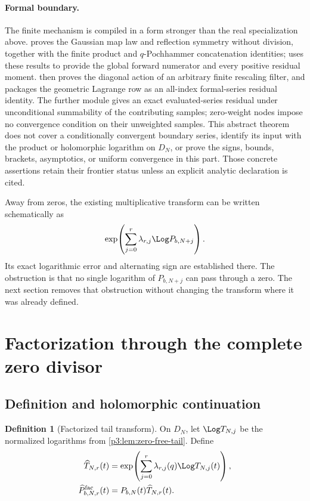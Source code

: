 \documentclass[11pt]{article}
\numberwithin{equation}{section}
\theoremstyle{definition}
\newtheorem{definition}[theorem]{Definition}
\theoremstyle{remark}
\begin{document}
\paragraph{Formal boundary.}
The finite mechanism is compiled in a form stronger than the real
specialization above.   proves the Gaussian
map law and reflection symmetry without division, together with the finite
product and \(q\)-Pochhammer concatenation identities;
 uses these results to provide the
global forward numerator and every positive residual moment.
 then proves the diagonal action of an
arbitrary finite rescaling filter, and
 packages the geometric Lagrange row
as an all-index formal-series residual identity.  The further module
 gives an exact evaluated-series residual under
unconditional summability of the contributing samples; zero-weight nodes impose
no convergence condition on their unweighted samples.  This abstract theorem
does not cover a conditionally convergent boundary series, identify its input
with the product or holomorphic logarithm on \(D_N\), or prove the signs, bounds,
brackets, asymptotics, or uniform convergence in this part.  Those concrete
assertions retain their frontier status unless an explicit analytic declaration
is cited.

Away from zeros, the existing multiplicative transform can be written schematically as
\[
 \exp\!\left(\sum_{j=0}^{r}\lambda_{r,j}\Log P_{b,N+j}\right).
\]
Its exact logarithmic error and alternating sign are established there.  The obstruction is
that no single logarithm of $P_{b,N+j}$ can pass through a zero.  The next section removes
that obstruction without changing the transform where it was already defined.

\section{Factorization through the complete zero divisor}\label{p3:sec:factorized}

\subsection{Definition and holomorphic continuation}

\begin{definition}[Factorized tail transform]\label{p3:def:factorized}
On $D_N$, let $\Log T_{N,j}$ be the normalized logarithms from
\cref{p3:lem:zero-free-tail}.  Define
\begin{align}
 \widehat T_{N,r}(t)
   &=\exp\!\left(\sum_{j=0}^{r}\lambda_{r,j}(q)\Log T_{N,j}(t)\right),
 \label{p3:eq:hat-tail}\\
 \widehat P^{\mathrm{fac}}_{b,N,r}(t)
   &=P_{b,N}(t)\widehat T_{N,r}(t).
 \label{p3:eq:hat-factorized}
\end{align}
\end{definition}
\end{document}
